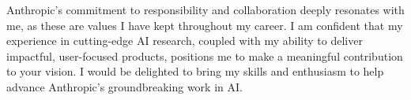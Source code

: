 \documentclass[10pt, letter]{ag-cv} %
\begin{document}
\begin{cvletter}
\begin{flushleft}
Anthropic’s commitment to responsibility and collaboration deeply resonates with me, as these are values I have kept throughout my career. I am confident that my experience in cutting-edge AI research, coupled with my ability to deliver impactful, user-focused products, positions me to make a meaningful contribution to your vision. I would be delighted to bring my skills and enthusiasm to help advance Anthropic's groundbreaking work in AI.

\end{flushleft}

\end{cvletter}


\makeletterclosing %
\end{document}
